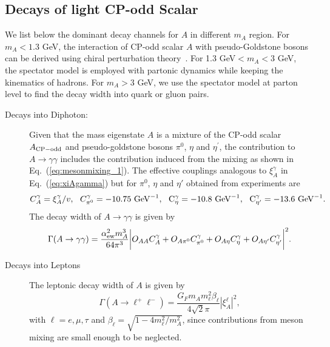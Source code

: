 \documentclass[letterpaper,11pt]{article}
\begin{document}
\subsection{Decays of light CP-odd Scalar}
\label{sec:Adecay}

 We list below the dominant decay channels for $A$ in different $m_A$ region.    
For $m_A<1.3$ GeV, the interaction of CP-odd scalar $A$ with pseudo-Goldstone bosons can be derived using chiral perturbation theory~\cite{Domingo:2016yih}.  For 1.3 GeV$<m_A<3$ GeV, the spectator model is employed with  partonic dynamics while keeping the kinematics of hadrons.  For $m_A>3$ GeV, we use the spectator model at parton level to find the decay width into quark or gluon pairs.
 
\begin{description}
 
\item[Decays into Diphoton:]
 
Given that the mass eigenstate $A$ is a mixture of the CP-odd scalar $A_{\rm CP-odd}$ and pseudo-goldstone bosons $\pi^0$, $\eta$ and $\eta^\prime$, the contribution to $A\rightarrow \gamma\gamma$ includes the contribution induced from the mixing as shown in Eq.~(\ref{eq:mesonmixing_1}). The effective couplings analogous to $\xi_A^\gamma$ in Eq.~(\ref{eq:xiAgamma}) but for $\pi^0$, $\eta$ and $\eta'$ obtained from experiments are
\begin{equation}
    C_{A}^\gamma=\xi_{A}^\gamma/v,\ \ 
    C_{\pi^0}^\gamma=-10.75\ \rm{GeV}^{-1},\  \ 
    C_{\eta}^\gamma=-10.8\ \rm{GeV}^{-1},\ \ 
    C_{\eta'}^\gamma=-13.6\ \rm{GeV}^{-1}.
\end{equation}
The decay width of $A\to \gamma\gamma$ is given by 
\begin{equation}
    \Gamma(A\to \gamma\gamma)=\frac{\alpha_{\rm ew}^2m_A^3}{64\pi^3}\biggl|O_{AA}C_A^\gamma+O_{A\pi^0}C_{\pi^0}^\gamma+O_{A\eta}C_{\eta}^\gamma+O_{A\eta'}C_{\eta'}^\gamma\biggr|^2.
\end{equation}

 
\item[Decays into Leptons]

The leptonic decay width of $A$ is given by
\begin{equation}
    \Gamma(A\to \ell^+\ell^-)=\frac{G_F m_A m_\ell^2 \beta_\ell}{4\sqrt{2}\pi } |\xi_A^{\ell}|^2,
\end{equation}
with $\ell=e, \mu, \tau$ and $\beta_\ell=\sqrt{1-4m_\ell^2/m_A^2}$, since contributions from meson mixing are small enough to be neglected.


\end{description}
\end{document}
